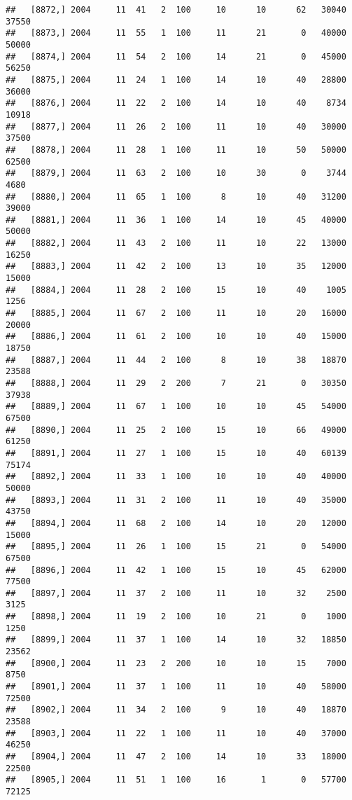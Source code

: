 \documentclass{article}\usepackage[]{graphicx}\usepackage[]{color}
\makeatletter
\newenvironment{kframe}{%
 \def\at@end@of@kframe{}%
 \ifinner\ifhmode%
  \def\at@end@of@kframe{\end{minipage}}%
  \begin{minipage}{\columnwidth}%
 \fi\fi%
 \def\FrameCommand##1{\hskip\@totalleftmargin \hskip-\fboxsep
 \colorbox{shadecolor}{##1}\hskip-\fboxsep
     \hskip-\linewidth \hskip-\@totalleftmargin \hskip\columnwidth}%
 \MakeFramed {\advance\hsize-\width
   \@totalleftmargin\z@ \linewidth\hsize
   \@setminipage}}%
 {\par\unskip\endMakeFramed%
 \at@end@of@kframe}
\newenvironment{knitrout}{}{} %
\makeatother
\begin{document}
\begin{knitrout}
\begin{kframe}
\begin{verbatim}
##   [8872,] 2004     11  41   2  100     10      10      62   30040   37550
##   [8873,] 2004     11  55   1  100     11      21       0   40000   50000
##   [8874,] 2004     11  54   2  100     14      21       0   45000   56250
##   [8875,] 2004     11  24   1  100     14      10      40   28800   36000
##   [8876,] 2004     11  22   2  100     14      10      40    8734   10918
##   [8877,] 2004     11  26   2  100     11      10      40   30000   37500
##   [8878,] 2004     11  28   1  100     11      10      50   50000   62500
##   [8879,] 2004     11  63   2  100     10      30       0    3744    4680
##   [8880,] 2004     11  65   1  100      8      10      40   31200   39000
##   [8881,] 2004     11  36   1  100     14      10      45   40000   50000
##   [8882,] 2004     11  43   2  100     11      10      22   13000   16250
##   [8883,] 2004     11  42   2  100     13      10      35   12000   15000
##   [8884,] 2004     11  28   2  100     15      10      40    1005    1256
##   [8885,] 2004     11  67   2  100     11      10      20   16000   20000
##   [8886,] 2004     11  61   2  100     10      10      40   15000   18750
##   [8887,] 2004     11  44   2  100      8      10      38   18870   23588
##   [8888,] 2004     11  29   2  200      7      21       0   30350   37938
##   [8889,] 2004     11  67   1  100     10      10      45   54000   67500
##   [8890,] 2004     11  25   2  100     15      10      66   49000   61250
##   [8891,] 2004     11  27   1  100     15      10      40   60139   75174
##   [8892,] 2004     11  33   1  100     10      10      40   40000   50000
##   [8893,] 2004     11  31   2  100     11      10      40   35000   43750
##   [8894,] 2004     11  68   2  100     14      10      20   12000   15000
##   [8895,] 2004     11  26   1  100     15      21       0   54000   67500
##   [8896,] 2004     11  42   1  100     15      10      45   62000   77500
##   [8897,] 2004     11  37   2  100     11      10      32    2500    3125
##   [8898,] 2004     11  19   2  100     10      21       0    1000    1250
##   [8899,] 2004     11  37   1  100     14      10      32   18850   23562
##   [8900,] 2004     11  23   2  200     10      10      15    7000    8750
##   [8901,] 2004     11  37   1  100     11      10      40   58000   72500
##   [8902,] 2004     11  34   2  100      9      10      40   18870   23588
##   [8903,] 2004     11  22   1  100     11      10      40   37000   46250
##   [8904,] 2004     11  47   2  100     14      10      33   18000   22500
##   [8905,] 2004     11  51   1  100     16       1       0   57700   72125

\end{verbatim}
\end{kframe}
\end{knitrout}
\end{document}

